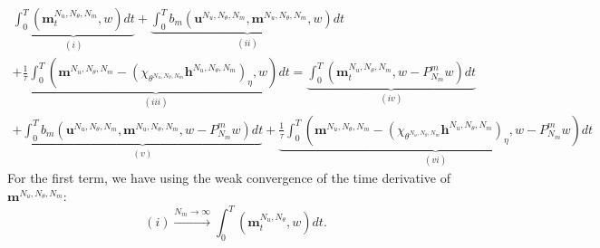 \documentclass[10pt,letterpaper,twoside]{amsart}
\theoremstyle{definition}{\newtheorem{definition}[lemma]{Definition}}
\theoremstyle{note}{\newtheorem{claim}{Claim}[section]
\newtheorem*{claim*}{Claim}}
\numberwithin{equation}{section}
\newcommand{\bma}{\mathbf{m}^{N_u,N_\theta,N_m}}
\newcommand{\bha}{\mathbf{h}^{N_u,N_\theta,N_m}}
\newcommand{\bua}{\mathbf{u}^{N_u,N_\theta,N_m}}
\newcommand{\tha}{\theta^{N_u,N_\theta,N_m}}
\newcommand{\bmb}{\mathbf{m}^{N_u,N_\theta}}
\begin{document}
\begin{multline*}
	\underbrace{\int_0^T(\bma_t,w) dt}_{(i)} + \underbrace{\int_0^T b_m(\bua,\bma,w) dt}_{(ii)} \\
	+\underbrace{\frac1{\tau}\int_0^T (\bma-(\chi_{\tha}\bha)_\eta,w) dt}_{(iii)} 
	= 	\underbrace{\int_0^T(\bma_t,w-P_{N_m}^m w) dt}_{(iv)} \\
	+ \underbrace{\int_0^T b_m(\bua,\bma,w-P_{N_m}^m w) dt}_{(v)} +\underbrace{\frac1{\tau}\int_0^T (\bma-(\chi_{\tha}\bha)_\eta,w-P_{N_m}^m w) dt}_{(vi)}
\end{multline*}
For the first term, we have using the weak convergence of the time derivative of $\bma$:
\begin{equation*}
	(i)\stackrel{N_m\to\infty}{\longrightarrow} \int_0^T(\bmb_t,w) dt.
\end{equation*}
\end{document}
